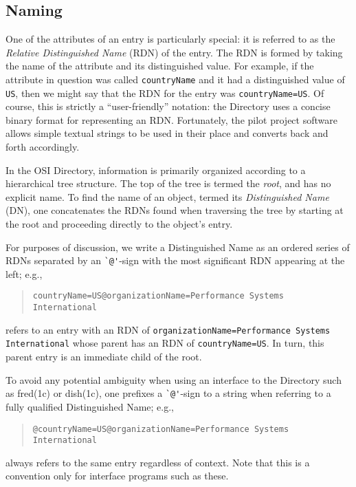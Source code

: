 \subsection	{Naming}
One of the attributes of an entry is particularly special:
it is referred to as the {\em Relative Distinguished Name\/} (RDN) of
the entry.
The RDN is formed by taking the name of the attribute and its
distinguished value.
For example,
if the attribute in question was called \verb"countryName" and it had
a distinguished value of \verb"US", then we might say that the RDN
for the entry was \verb"countryName=US".
Of course,
this is strictly a ``user-friendly'' notation:
the Directory uses a concise binary format for representing an RDN.
Fortunately,
the pilot project software allows simple textual strings to be used in their
place and converts back and forth accordingly.

In the OSI Directory,
information is primarily organized according to a hierarchical tree
structure.
The top of the tree is termed the {\em root},
and has no explicit name.
To find the  name of an object,
termed its {\em Distinguished Name\/} (DN),
one concatenates the RDNs found when traversing the tree by starting
at the root and proceeding directly to the object's entry.

For purposes of discussion,
we write a Distinguished Name as an ordered series of RDNs separated by
an \verb"`@'"-sign with the most significant RDN appearing at the left;
e.g.,
\begin{quote}\smaller\begin{verbatim}
countryName=US@organizationName=Performance Systems International
\end{verbatim}\end{quote}
refers to an entry with an RDN of
\verb"organizationName=Performance Systems International"
whose parent has an RDN of \verb"countryName=US".
In turn,
this parent entry is an immediate child of the root.

To avoid any potential ambiguity when using an interface to the Directory
such as \man fred(1c) or \man dish(1c),
one prefixes a \verb"`@'"-sign to a string when referring to a fully
qualified Distinguished Name;
e.g.,
\begin{quote}\small\begin{verbatim}
@countryName=US@organizationName=Performance Systems International
\end{verbatim}\end{quote}
always refers to the same entry regardless of context.
Note that this is a convention only for interface programs such as these.

